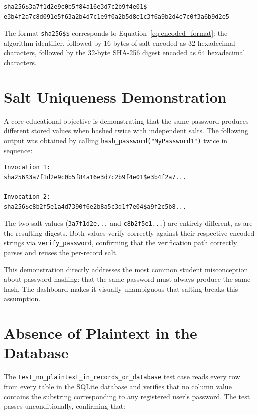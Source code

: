 \begin{lstlisting}[caption={Example stored credential as displayed on the dashboard},label={lst:stored_hash}]
sha256$3a7f1d2e9c0b5f84a16e3d7c2b9f4e01$
e3b4f2a7c8d091e5f63a2b4d7c1e9f0a2b5d8e1c3f6a9b2d4e7c0f3a6b9d2e5
\end{lstlisting}

The format \texttt{sha256\$<32 hex chars>\$<64 hex chars>} corresponds to Equation~\ref{eq:encoded_format}: the algorithm identifier, followed by 16 bytes of salt encoded as 32 hexadecimal characters, followed by the 32-byte SHA-256 digest encoded as 64 hexadecimal characters.

\section{Salt Uniqueness Demonstration}
\label{sec:results_salt_uniqueness}

A core educational objective is demonstrating that the same password produces different stored values when hashed twice with independent salts. The following output was obtained by calling \texttt{hash\_password("MyPassword1")} twice in sequence:

\begin{lstlisting}[caption={Two invocations of hash\_password with the same input},label={lst:salt_unique}]
Invocation 1:
sha256$3a7f1d2e9c0b5f84a16e3d7c2b9f4e01$e3b4f2a7...

Invocation 2:
sha256$c8b2f5e1a4d7390f6e2b8a5c3d1f7e04$a9f2c5b8...
\end{lstlisting}

The two salt values (\texttt{3a7f1d2e...} and \texttt{c8b2f5e1...}) are entirely different, as are the resulting digests. Both values verify correctly against their respective encoded strings via \texttt{verify\_password}, confirming that the verification path correctly parses and reuses the per-record salt.

This demonstration directly addresses the most common student misconception about password hashing: that the same password must always produce the same hash. The dashboard makes it visually unambiguous that salting breaks this assumption.

\section{Absence of Plaintext in the Database}
\label{sec:results_no_plaintext}

The \texttt{test\_no\_plaintext\_in\_records\_or\_database} test case reads every row from every table in the SQLite database and verifies that no column value contains the substring corresponding to any registered user's password. The test passes unconditionally, confirming that:

